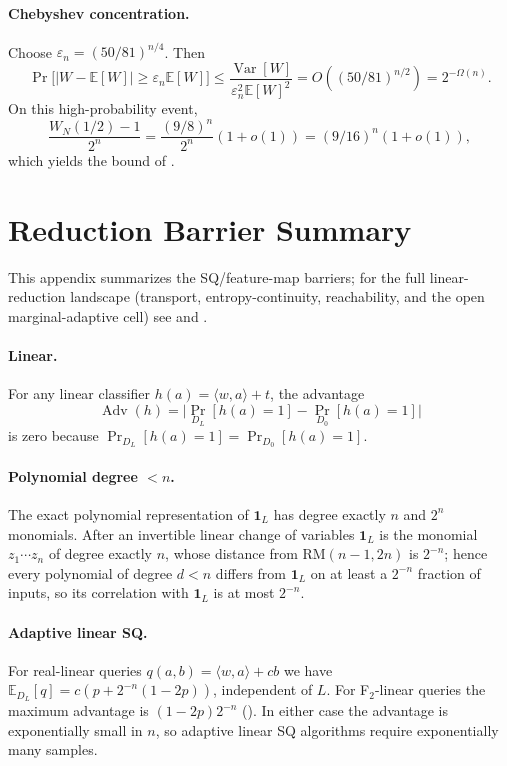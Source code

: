 \documentclass[11pt,a4paper]{article}
\theoremstyle{plain}
\theoremstyle{definition}
\newcommand{\E}{\mathbb{E}}
\DeclareMathOperator{\Adv}{Adv}
\DeclareMathOperator{\Var}{Var}
\begin{document}
\paragraph{Chebyshev concentration.}  Choose $\varepsilon_n = (50/81)^{n/4}$.  Then
\[
\Pr\bigl[|W-\E[W]| \ge \varepsilon_n \E[W]\bigr]
\le \frac{\Var[W]}{\varepsilon_n^2 \E[W]^2}
= O((50/81)^{n/2}) = 2^{-\Omega(n)}.
\]
On this high-probability event,
\[
\frac{W_N(1/2)-1}{2^n} = \frac{(9/8)^n}{2^n}(1+o(1)) = (9/16)^n(1+o(1)),
\]
which yields the bound of .

\section{Reduction Barrier Summary}
\label{app:barrier}

This appendix summarizes the SQ/feature-map barriers; for the full linear-reduction landscape (transport, entropy-continuity, reachability, and the open marginal-adaptive cell) see  and .

\paragraph{Linear.} For any linear classifier $h(a) = \langle w,a \rangle + t$, the advantage
\[
\Adv(h) = \bigl| \Pr_{D_L}[h(a)=1] - \Pr_{D_0}[h(a)=1] \bigr|
\]
is zero because $\Pr_{D_L}[h(a)=1] = \Pr_{D_0}[h(a)=1]$.

\paragraph{Polynomial degree $<n$.} The exact polynomial representation of $\mathbf{1}_L$ has degree exactly $n$ and $2^n$ monomials. After an invertible linear change of variables $\mathbf{1}_L$ is the monomial $z_1\cdots z_n$ of degree exactly $n$, whose distance from $\mathrm{RM}(n-1,2n)$ is $2^{-n}$; hence every polynomial of degree $d < n$ differs from $\mathbf{1}_L$ on at least a $2^{-n}$ fraction of inputs, so its correlation with $\mathbf{1}_L$ is at most $2^{-n}$.

\paragraph{Adaptive linear SQ.} For real-linear queries $q(a,b) = \langle w,a \rangle + cb$ we have $\E_{D_L}[q] = c(p + 2^{-n}(1-2p))$, independent of $L$. For F$_2$-linear queries the maximum advantage is $(1-2p)2^{-n}$ (). In either case the advantage is exponentially small in $n$, so adaptive linear SQ algorithms require exponentially many samples.
\end{document}
